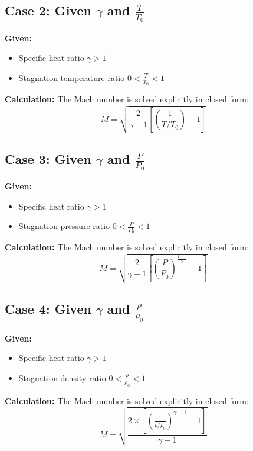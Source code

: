 \subsection*{Case 2: Given $\gamma$ and $\frac{T}{T_0}$}

\textbf{Given:}
\begin{itemize}[nosep]
    \item Specific heat ratio $\gamma > 1$
    \item Stagnation temperature ratio $0 < \frac{T}{T_0} < 1$
\end{itemize}

\textbf{Calculation:} The Mach number is solved explicitly in closed form:
\begin{equation}
M = \sqrt{\frac{2}{\gamma-1}\left[\left(\frac{1}{T/T_0}\right)-1\right]}
\end{equation}


\subsection*{Case 3: Given $\gamma$ and $\frac{P}{P_0}$}

\textbf{Given:}
\begin{itemize}[nosep]
    \item Specific heat ratio $\gamma > 1$
    \item Stagnation pressure ratio $0 < \frac{P}{P_0} < 1$
\end{itemize}

\textbf{Calculation:} The Mach number is solved explicitly in closed form:
\begin{equation}
M = \sqrt{\frac{2}{\gamma-1}\left[\left(\frac{P}{P_0}\right)^{\frac{1-\gamma}{\gamma}}-1\right]}
\end{equation}


\subsection*{Case 4: Given $\gamma$ and $\frac{\rho}{\rho_0}$}

\textbf{Given:}
\begin{itemize}[nosep]
    \item Specific heat ratio $\gamma > 1$
    \item Stagnation density ratio $0 < \frac{\rho}{\rho_0} < 1$
\end{itemize}

\textbf{Calculation:} The Mach number is solved explicitly in closed form:
\begin{equation}
M = \sqrt{\frac{2 \times \left[\left(\frac{1}{\rho/\rho_0}\right)^{\gamma-1}-1\right]}{\gamma-1}}
\end{equation}


